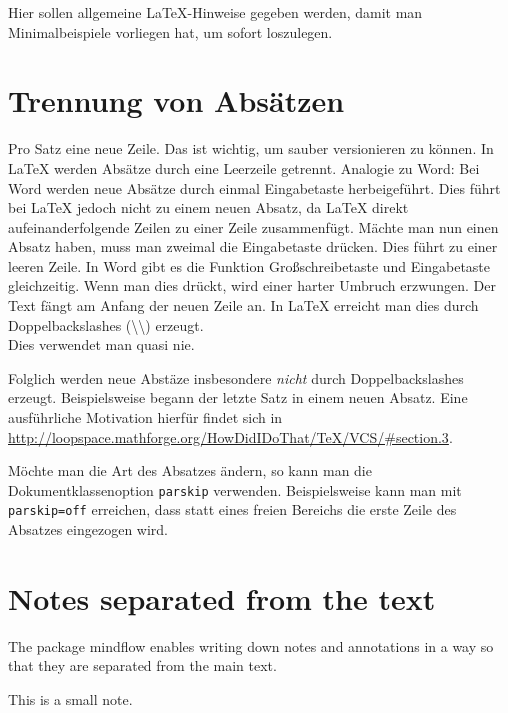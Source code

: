 \documentclass[
  numbers=autoendperiod,
  ngerman,  %
  a4paper,  %
  twoside,  %
  bibliography=totoc,
  headsepline,
  cleardoublepage=empty,
  parskip=half,
  draft=false
]{scrbook}
\theoremstyle{break}
\begin{document}
Hier sollen allgemeine \LaTeX-Hinweise gegeben werden, damit man Minimalbeispiele vorliegen hat, um sofort loszulegen.

\section{Trennung von Absätzen}

\begin{ltgexample}
Pro Satz eine neue Zeile.
Das ist wichtig, um sauber versionieren zu können.
In LaTeX werden Absätze durch eine Leerzeile getrennt.
Analogie zu Word: Bei Word werden neue Absätze durch einmal Eingabetaste herbeigeführt.
Dies führt bei LaTeX jedoch nicht zu einem neuen Absatz, da LaTeX direkt aufeinanderfolgende Zeilen zu einer Zeile zusammenfügt.
Mächte man nun einen Absatz haben, muss man zweimal die Eingabetaste drücken.
Dies führt zu einer leeren Zeile.
In Word gibt es die Funktion Großschreibetaste und Eingabetaste gleichzeitig.
Wenn man dies drückt, wird einer harter Umbruch erzwungen.
Der Text fängt am Anfang der neuen Zeile an.
In LaTeX erreicht man dies durch Doppelbackslashes (\textbackslash\textbackslash) erzeugt.
\\
Dies verwendet man quasi nie.

Folglich werden neue Abstäze insbesondere \emph{nicht} durch Doppelbackslashes erzeugt.
Beispielsweise begann der letzte Satz in einem neuen Absatz.
Eine ausführliche Motivation hierfür findet sich in \url{http://loopspace.mathforge.org/HowDidIDoThat/TeX/VCS/#section.3}.
\end{ltgexample}

Möchte man die Art des Absatzes ändern, so kann man die Dokumentklassenoption \texttt{parskip} verwenden.
Beispielsweise kann man mit \texttt{parskip=off} erreichen, dass statt eines freien Bereichs die erste Zeile des Absatzes eingezogen wird.

\section{Notes separated from the text}

The package mindflow enables writing down notes and annotations in a way so that they are separated from the main text.

\begin{ltgexample}
\begin{mindflow}
This is a small note.
\end{mindflow}
\end{ltgexample}
\end{document}
